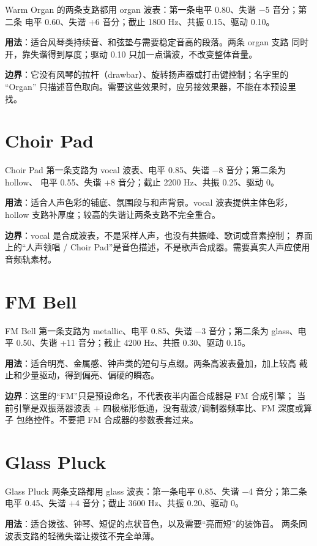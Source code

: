 Warm Organ 的两条支路都用 organ 波表：第一条电平 0.80、失谐 −5 音分；第二条
电平 0.60、失谐 +6 音分；截止 1800 Hz、共振 0.15、驱动 0.10。

\textbf{用法}：适合风琴类持续音、和弦垫与需要稳定音高的段落。两条 organ 支路
同时开，靠失谐得到厚度；驱动 0.10 只加一点谐波，不改变整体音量。

\textbf{边界}：它没有风琴的拉杆（drawbar）、旋转扬声器或打击键控制；名字里的
“Organ” 只描述音色取向。需要这些效果时，应另接效果器，不能在本预设里找。

\section{Choir Pad}

Choir Pad 第一条支路为 vocal 波表、电平 0.85、失谐 −8 音分；第二条为 hollow、
电平 0.55、失谐 +8 音分；截止 2200 Hz、共振 0.25、驱动 0。

\textbf{用法}：适合人声色彩的铺底、氛围段与和声背景。vocal 波表提供主体色彩，
hollow 支路补厚度；较高的失谐让两条支路不完全重合。

\textbf{边界}：vocal 是合成波表，不是采样人声，也没有共振峰、歌词或音素控制；
界面上的“人声领唱 / Choir Pad”是音色描述，不是歌声合成器。需要真实人声应使用
音频轨素材。

\section{FM Bell}

FM Bell 第一条支路为 metallic、电平 0.85、失谐 −3 音分；第二条为 glass、电平
0.50、失谐 +11 音分；截止 4200 Hz、共振 0.30、驱动 0.15。

\textbf{用法}：适合明亮、金属感、钟声类的短句与点缀。两条高波表叠加，加上较高
截止和少量驱动，得到偏亮、偏硬的瞬态。

\textbf{边界}：这里的“FM”只是预设命名，不代表夜半内置合成器是 FM 合成引擎；
当前引擎是双振荡器波表 + 四极梯形低通，没有载波/调制器频率比、FM 深度或算子
包络控件。不要把 FM 合成器的参数表套过来。

\section{Glass Pluck}

Glass Pluck 两条支路都用 glass 波表：第一条电平 0.85、失谐 −4 音分；第二条
电平 0.45、失谐 +4 音分；截止 3600 Hz、共振 0.20、驱动 0。

\textbf{用法}：适合拨弦、钟琴、短促的点状音色，以及需要“亮而短”的装饰音。
两条同波表支路的轻微失谐让拨弦不完全单薄。


